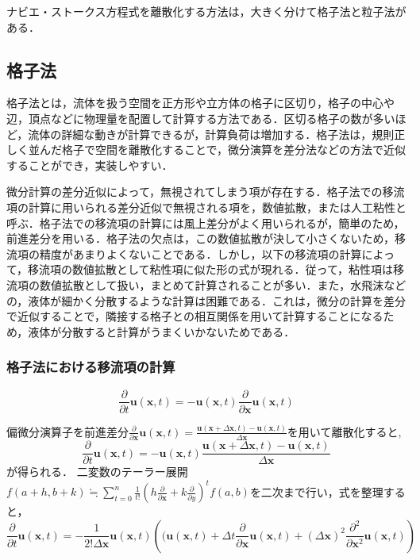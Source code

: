 \documentclass[a4j,12pt]{jreport}
\begin{document}
ナビエ・ストークス方程式を離散化する方法は，大きく分けて格子法と粒子法がある．

\subsection{格子法} \label{subsec:grid}
格子法とは，流体を扱う空間を正方形や立方体の格子に区切り，格子の中心や辺，頂点などに物理量を配置して計算する方法である．区切る格子の数が多いほど，流体の詳細な動きが計算できるが，計算負荷は増加する．格子法は，規則正しく並んだ格子で空間を離散化することで，微分演算を差分法などの方法で近似することができ，実装しやすい．

微分計算の差分近似によって，無視されてしまう項が存在する．格子法での移流項の計算に用いられる差分近似で無視される項を，数値拡散，または人工粘性と呼ぶ．格子法での移流項の計算には風上差分がよく用いられるが，簡単のため，前進差分を用いる．格子法の欠点は，この数値拡散が決して小さくないため，移流項の精度があまりよくないことである．しかし，以下の移流項の計算によって，移流項の数値拡散として粘性項に似た形の式が現れる．従って，粘性項は移流項の数値拡散として扱い，まとめて計算されることが多い．また，水飛沫などの，液体が細かく分散するような計算は困難である．これは，微分の計算を差分で近似することで，隣接する格子との相互関係を用いて計算することになるため，液体が分散すると計算がうまくいかないためである．

\subsubsection{格子法における移流項の計算} \label{subsec:gridadvect}
\begin{equation}\label{eq:uncalculated_pressure_before}
\frac{\partial}{\partial t}\bm{u} (\bm{x},t)  = -\bm{u} (\bm{x},t) \frac{\partial}{\partial \bm{x}}\bm{u} (\bm{x},t)
\end{equation} 

偏微分演算子を前進差分$\frac{\partial}{\partial \bm{x}}\bm{u} (\bm{x},t)  = \frac{\bm{u} (\bm{x}+\varDelta \bm{x},t)  - \bm{u} (\bm{x},t) }{\varDelta \bm{x}}$を用いて離散化すると,
$$\frac{\partial}{\partial t}\bm{u} (\bm{x},t)  =  -\bm{u} (\bm{x},t) \frac{\bm{u} (\bm{x}+\varDelta \bm{x},t)  - \bm{u} (\bm{x},t) }{\varDelta \bm{x}}$$
が得られる．
二変数のテーラー展開$f (a+h,b+k)  \fallingdotseq \sum\limits_{t=0}^n \frac{1}{t!} (h\frac{\partial}{\partial \bm{x}} + k\frac{\partial}{\partial y}) ^t f (a,b) $を二次まで行い，式を整理すると，
$$\frac{\partial}{\partial t}\bm{u} (\bm{x},t)  = -\frac{1}{2!\varDelta \bm{x}}\bm{u} (\bm{x},t) \left (  (\bm{u} (\bm{x},t) +\varDelta t\frac{\partial}{\partial \bm{x}}\bm{u} (\bm{x},t)  +  (\varDelta \bm{x}) ^2\frac{\partial^2}{\partial \bm{x}^2}\bm{u} (\bm{x},t)  \right) $$
            
\end{document}
